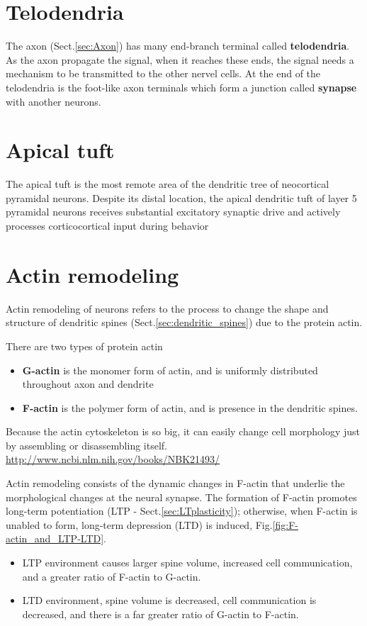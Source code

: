 


\section{Telodendria}
\label{sec:telodendria}

The axon (Sect.\ref{sec:Axon}) has many end-branch terminal called {\bf
telodendria}.  As the axon propagate the signal, when it reaches these ends, the
signal needs a mechanism to be transmitted to the other nervel cells.
At the end of the telodendria is the foot-like axon terminals which form a
junction called {\bf synapse} with another neurons.


\section{Apical tuft}
\label{sec:apical-tuft}

The apical tuft is the most remote area of the dendritic tree of neocortical
pyramidal neurons. Despite its distal location, the apical dendritic tuft of
layer 5 pyramidal neurons receives substantial excitatory synaptic drive and
actively processes corticocortical input during behavior


\section{Actin remodeling}
\label{sec:actin_remodeling}

Actin remodeling of neurons refers to the process to change the shape and
structure of dendritic spines (Sect.\ref{sec:dendritic_spines}) due to the
protein actin.

There are two types of protein actin
\begin{itemize}
  \item {\bf G-actin} is the monomer form of actin, and is uniformly distributed
  throughout axon and dendrite
  \item {\bf F-actin} is the polymer form of actin, and is presence in the
  dendritic spines.
\end{itemize}
Because the actin cytoskeleton is so big, it can easily change cell morphology
just by assembling or disassembling itself.
\url{http://www.ncbi.nlm.nih.gov/books/NBK21493/}

Actin remodeling consists of the dynamic changes in F-actin that
underlie the morphological changes at the neural synapse.
The formation of F-actin promotes long-term potentiation (LTP -
Sect.\ref{sec:LTplasticity}); otherwise, when F-actin is unabled to form,
long-term depression (LTD) is induced, Fig.\ref{fig:F-actin_and_LTP-LTD}.
\begin{itemize}
  \item LTP environment causes larger spine volume, increased cell
  communication, and a greater ratio of F-actin to G-actin.
  
  \item LTD environment, spine volume is decreased, cell communication is
  decreased, and there is a far greater ratio of G-actin to F-actin.
\end{itemize}

